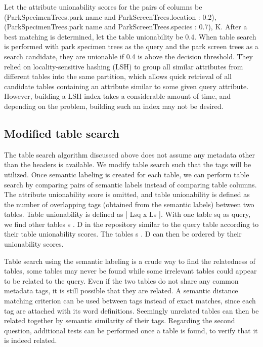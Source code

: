 Let the attribute unionability scores for the pairs of columns be {(ParkSpecimenTrees.park name and ParkScreenTrees.location : 0.2), (ParkSpecimenTrees.park name and ParkScreenTrees.species : 0.7), K}. After a best matching is determined, let the table unionability be 0.4. When table search is performed with park specimen trees as the query and the park screen trees as a search candidate, they are unionable if 0.4 is above the decision threshold.
They relied on locality-sensitive hashing (LSH) to group all similar attributes from different tables into the same partition, which allows quick retrieval of all candidate tables containing an attribute similar to some given query attribute. However, building a LSH index takes a considerable amount of time, and depending on the problem, building such an index may not be desired.

\subsection{Modified table search}
\label{ssec:ModifiedTableSearch}

The table search algorithm discussed above does not assume any metadata other than the headers is available. We modify table search such that the tags will be utilized. Once semantic labeling is created for each table, we can perform table search by comparing pairs of semantic labels instead of comparing table columns. The attribute unionability score is omitted, and table unionability is defined as the number of overlapping tags (obtained from the semantic labels) between two tables. Table unionability is defined as | Lsq x Ls |. With one table sq as query, we find other tables s . D in the repository similar to the query table according to their table unionability scores. The tables s . D can then be ordered by their unionability scores.

Table search using the semantic labeling is a crude way to find the relatedness of tables, some tables may never be found while some irrelevant tables could appear to be related to the query. Even if the two tables do not share any common metadata tags, it is still possible that they are related. A semantic distance matching criterion can be used between tags instead of exact matches, since each tag are attached with its word definitions. Seemingly unrelated tables can then be related together by semantic similarity of their tags. Regarding the second question, additional tests can be performed once a table is found, to verify that it is indeed related.

